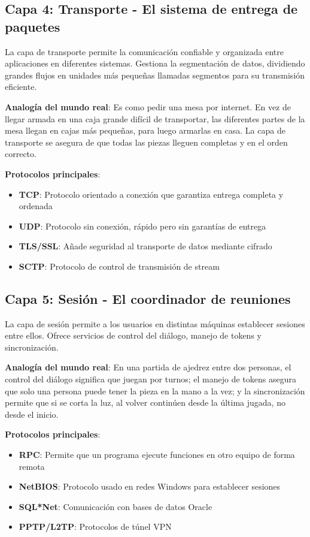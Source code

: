 \subsection{Capa 4: Transporte - El sistema de entrega de paquetes}

La capa de transporte permite la comunicación confiable y organizada entre aplicaciones en diferentes sistemas. Gestiona la segmentación de datos, dividiendo grandes flujos en unidades más pequeñas llamadas segmentos para su transmisión eficiente.

\textbf{Analogía del mundo real}: Es como pedir una mesa por internet. En vez de llegar armada en una caja grande difícil de transportar, las diferentes partes de la mesa llegan en cajas más pequeñas, para luego armarlas en casa. La capa de transporte se asegura de que todas las piezas lleguen completas y en el orden correcto.

\textbf{Protocolos principales}:
\begin{itemize}
    \item \textbf{TCP}: Protocolo orientado a conexión que garantiza entrega completa y ordenada
    \item \textbf{UDP}: Protocolo sin conexión, rápido pero sin garantías de entrega
    \item \textbf{TLS/SSL}: Añade seguridad al transporte de datos mediante cifrado
    \item \textbf{SCTP}: Protocolo de control de transmisión de stream
\end{itemize}

\subsection{Capa 5: Sesión - El coordinador de reuniones}

La capa de sesión permite a los usuarios en distintas máquinas establecer sesiones entre ellos. Ofrece servicios de control del diálogo, manejo de tokens y sincronización.

\textbf{Analogía del mundo real}: En una partida de ajedrez entre dos personas, el control del diálogo significa que juegan por turnos; el manejo de tokens asegura que solo una persona puede tener la pieza en la mano a la vez; y la sincronización permite que si se corta la luz, al volver continúen desde la última jugada, no desde el inicio.

\textbf{Protocolos principales}:
\begin{itemize}
    \item \textbf{RPC}: Permite que un programa ejecute funciones en otro equipo de forma remota
    \item \textbf{NetBIOS}: Protocolo usado en redes Windows para establecer sesiones
    \item \textbf{SQL*Net}: Comunicación con bases de datos Oracle
    \item \textbf{PPTP/L2TP}: Protocolos de túnel VPN
\end{itemize}

